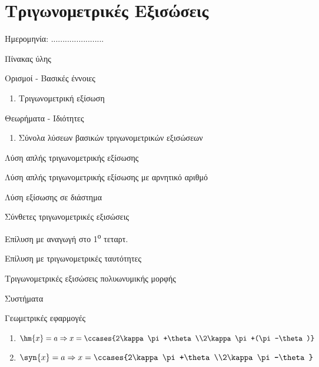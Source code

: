\documentclass[twoside,nofonts,internet,math,spyros]{frontisthrio}
\newcommand{\tss}[1]{\textsuperscript{#1}}
\newcommand{\myitem}{\stepcounter{enumi}\item[\raisebox{0.5mm}{\faExclamationTriangle}\ \Large$\square$]}
\begin{document}
\section{Τριγωνομετρικές Εξισώσεις}
\begin{flushright}
\faCalendar* Ημερομηνία: .......................
\end{flushright}
\begin{mybox}[mysubtitle]{Πίνακας ύλης}
\begin{tcbraster}[raster columns=2,raster equal height]
\begin{myleftbox}{Ορισμοί - Βασικές έννοιες\ \ \faBook}
\begin{enumerate}[itemsep=0mm]
\item Τριγωνομετρική εξίσωση
\end{enumerate}
\end{myleftbox}
\begin{myrightbox}{Θεωρήματα - Ιδιότητες\ \ \faTools}
\begin{enumerate}[itemsep=0mm]
\item Σύνολα λύσεων βασικών τριγωνομετρικών εξισώσεων
\end{enumerate}
\end{myrightbox}
\end{tcbraster}
\begin{multicols}{2}
\begin{todolist}[itemsep=0mm]
\myitem Λύση απλής τριγωνομετρικής εξίσωσης
\item Λύση απλής τριγωνομετρικής εξίσωσης με αρνητικό αριθμό
\item Λύση εξίσωσης σε διάστημα
\item Σύνθετες τριγωνομετρικές εξισώσεις
\item Επίλυση με αναγωγή στο 1\tss{ο} τεταρτ.
\item Επίλυση με τριγωνομετρικές ταυτότητες
\item Τριγωνομετρικές εξισώσεις πολυωνυμικής μορφής
\item Συστήματα
\item Γεωμετρικές εφαρμογές
\end{todolist}
\end{multicols}
\begin{multicols}{2}
\begin{enumerate}[itemsep=0mm]
\item $ \hm{x}=a\Rightarrow x=\ccases{2\kappa\pi+\theta\\2\kappa\pi+(\pi-\theta)} $
\item $ \syn{x}=a\Rightarrow x=\ccases{2\kappa\pi+\theta\\2\kappa\pi-\theta} $
\end{enumerate}
\end{multicols}
\end{mybox}
\newpage
\end{document}
